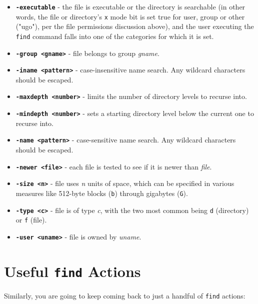 \documentclass[10pt,american,]{book}
\numberwithin{figure}{chapter}
\begin{document}
\begin{itemize}
\item
  \textbf{\texttt{-executable}} - the file is executable or the
  directory is searchable (in other words, the file or directory's
  \texttt{x} mode bit is set true for user, group or other ("ugo"), per
  the file permissions discussion above), and the user executing the
  \texttt{find} command falls into one of the categories for which it is
  set.
\item
  \textbf{\texttt{-group\ \textless{}gname\textgreater{}}} - file
  belongs to group \emph{gname}.
\item
  \textbf{\texttt{-iname\ \textless{}pattern\textgreater{}}} -
  case-insensitive name search. Any wildcard characters should be
  escaped.
\item
  \textbf{\texttt{-maxdepth\ \textless{}number\textgreater{}}} - limits
  the number of directory levels to recurse into.
\item
  \textbf{\texttt{-mindepth\ \textless{}number\textgreater{}}} - sets a
  starting directory level below the current one to recurse into.
\item
  \textbf{\texttt{-name\ \textless{}pattern\textgreater{}}} -
  case-sensitive name search. Any wildcard characters should be escaped.
\item
  \textbf{\texttt{-newer\ \textless{}file\textgreater{}}} - each file is
  tested to see if it is newer than \emph{file}.
\item
  \textbf{\texttt{-size\ \textless{}n\textgreater{}}} - file uses
  \emph{n} units of space, which can be specified in various measures
  like 512-byte blocks (\texttt{b}) through gigabytes (\texttt{G}).
\item
  \textbf{\texttt{-type\ \textless{}c\textgreater{}}} - file is of type
  \emph{c}, with the two most common being \texttt{d} (directory) or
  \texttt{f} (file).
\item
  \textbf{\texttt{-user\ \textless{}uname\textgreater{}}} - file is
  owned by \emph{uname}.
\end{itemize}

\section*{\texorpdfstring{Useful \texttt{find}
Actions}{Useful find Actions}}\label{useful-find-actions}

Similarly, you are going to keep coming back to just a handful of
\texttt{find} actions:
\end{document}
